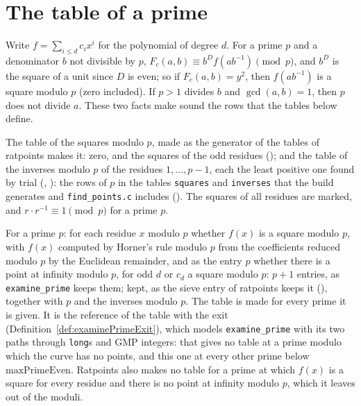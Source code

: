 \section{The table of a prime}\label{sec:primeTables}

Write $f = \sum_{i \le d} c_i x^i$ for the polynomial of degree $d$. For a prime $p$ and a
denominator $b$ not divisible by $p$, $F_c(a, b) \equiv b^D f(a b^{-1}) \pmod p$, and $b^D$ is the
square of a unit since $D$ is even; so if $F_c(a, b) = y^2$, then $f(a b^{-1})$ is a square
modulo $p$ (zero included). If $p > 1$ divides $b$ and $\gcd(a, b) = 1$, then $p$ does not divide
$a$. These two facts make sound the rows that the tables below define.

\begin{definition}\label{def:squaresMod}
  \leanok
  The table of the squares modulo $p$, made as the generator of the tables of ratpoints makes it:
  zero, and the squares of the odd residues (); and the
  table of the inverses modulo $p$ of the residues $1, \dots, p - 1$, each the least positive one
  found by trial (, ):
  the rows of $p$ in the tables \verb|squares| and \verb|inverses| that the build generates and
  \verb|find_points.c| includes (). The squares of all residues are
  marked, and $r \cdot r^{-1} \equiv 1 \pmod p$ for a prime $p$.
\end{definition}

\begin{definition}\label{def:examinePrime}
  \leanok
  For a prime $p$: for each residue $x$ modulo $p$ whether $f(x)$ is a square modulo $p$, with
  $f(x)$ computed by Horner's rule modulo $p$ from the coefficients reduced modulo $p$ by the
  Euclidean remainder, and as the entry $p$ whether there is a point at infinity modulo $p$, for odd
  $d$ or $c_d$ a square modulo $p$: $p + 1$ entries, as \verb|examine_prime| keeps them; kept, as
  the sieve entry of ratpoints keeps it (), together with $p$ and
  the inverses modulo $p$. The table is made for every prime it is given. It is the reference of the
  table with the exit (Definition~\ref{def:examinePrimeExit}), which models \verb|examine_prime|
  with its two paths through \verb|long|s and GMP integers: that gives no table at a prime modulo
  which the curve has no points, and this one at every other prime below $\mathrm{maxPrimeEven}$.
  Ratpoints also makes no table for a prime at which $f(x)$ is a square for every residue and there
  is no point at infinity modulo $p$, which it leaves out of the moduli.
\end{definition}

